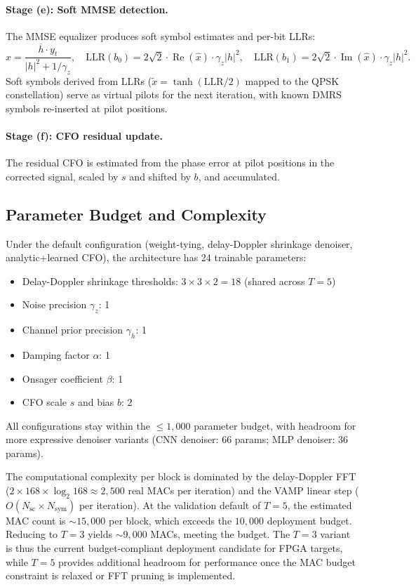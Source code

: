 \documentclass{article}
\begin{document}
\paragraph{Stage (e): Soft MMSE detection.}
The MMSE equalizer produces soft symbol estimates and per-bit LLRs:
\begin{equation}
\hat{x} = \frac{\overline{h} \cdot y_t}{|h|^2 + 1/\gamma_z}, \quad
\mathrm{LLR}(b_0) = 2\sqrt{2} \cdot \operatorname{Re}(\hat{x}) \cdot \gamma_z |h|^2, \quad
\mathrm{LLR}(b_1) = 2\sqrt{2} \cdot \operatorname{Im}(\hat{x}) \cdot \gamma_z |h|^2.
\end{equation}
Soft symbols derived from LLRs ($\tilde{x} = \tanh(\mathrm{LLR}/2)$ mapped to the QPSK constellation) serve as virtual pilots for the next iteration, with known DMRS symbols re-inserted at pilot positions.

\paragraph{Stage (f): CFO residual update.}
The residual CFO is estimated from the phase error at pilot positions in the corrected signal, scaled by $s$ and shifted by $b$, and accumulated.

\subsection{Parameter Budget and Complexity}
\label{sec:params}

Under the default configuration (weight-tying, delay-Doppler shrinkage denoiser, analytic+learned CFO), the architecture has 24 trainable parameters:
\begin{itemize}
  \item Delay-Doppler shrinkage thresholds: $3 \times 3 \times 2 = 18$ (shared across $T=5$)
  \item Noise precision $\gamma_z$: 1
  \item Channel prior precision $\gamma_h$: 1
  \item Damping factor $\alpha$: 1
  \item Onsager coefficient $\beta$: 1
  \item CFO scale $s$ and bias $b$: 2
\end{itemize}
All configurations stay within the $\leq 1{,}000$ parameter budget, with headroom for more expressive denoiser variants (CNN denoiser: 66 params; MLP denoiser: 36 params).

The computational complexity per block is dominated by the delay-Doppler FFT ($2 \times 168 \times \log_2 168 \approx 2{,}500$ real MACs per iteration) and the VAMP linear step ($O(N_{\mathrm{sc}} \times N_{\mathrm{sym}})$ per iteration). At the validation default of $T=5$, the estimated MAC count is $\sim 15{,}000$ per block, which exceeds the $10{,}000$ deployment budget. Reducing to $T=3$ yields $\sim 9{,}000$ MACs, meeting the budget. The $T=3$ variant is thus the current budget-compliant deployment candidate for FPGA targets, while $T=5$ provides additional headroom for performance once the MAC budget constraint is relaxed or FFT pruning is implemented. %
\end{document}
